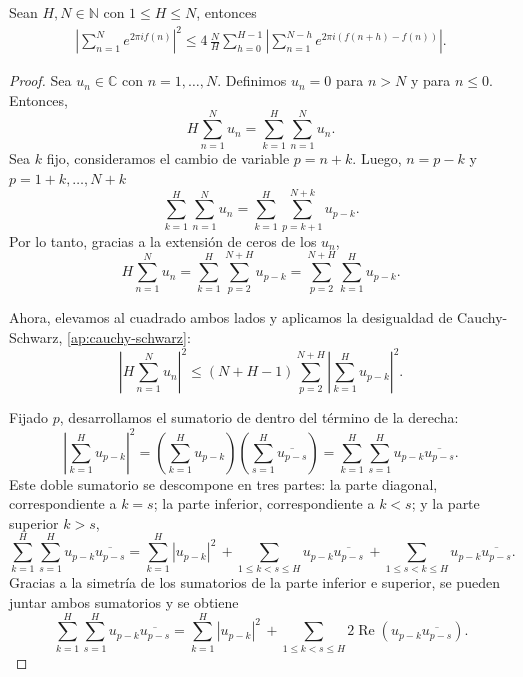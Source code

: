 \begin{lemma}
    \label{lem:vandercorput}
    Sean $H,N \in \mathbb{N}$ con $1 \leq H \leq N$, entonces
    \begin{align}
        \left| \sum_{n=1}^N e^{2\pi i f(n)} \right|^2 \leq
        4 \, \frac{N}{H} \sum_{h=0}^{H-1} \left| \sum_{n=1}^{N-h} e^{2\pi i (f(n+h) - f(n))} \right|.
    \end{align}
\end{lemma}

\begin{proof}
    Sea $u_n \in \mathbb{C}$ con $n = 1, \dots, N$. Definimos $u_n = 0$ para $n > N$ y 
    para $n \leq 0$. Entonces,
    \[
        H \sum_{n=1}^{N} u_n = \sum_{k=1}^{H} \sum_{n=1}^{N} u_n.
    \]
    Sea $k$ fijo, consideramos el cambio de variable $p = n+k$. Luego, $n = p-k$ y $p=1+k,\dots,N+k$
    \[
        \sum_{k=1}^{H} \sum_{n=1}^{N} u_n =
        \sum_{k=1}^{H} \sum_{p=k+1}^{N+k} u_{p-k}.
    \]
    Por lo tanto, gracias a la extensión de ceros de los $u_n$,
    \[
        H \sum_{n=1}^{N} u_n =
        \sum_{k=1}^{H} \sum_{p=2}^{N+H} u_{p-k} =
        \sum_{p=2}^{N+H} \sum_{k=1}^{H} u_{p-k}.
    \]
    
    Ahora, elevamos al cuadrado ambos lados y aplicamos la desigualdad de Cauchy-Schwarz, \ref{ap:cauchy-schwarz}:
    \[
        \left| H \sum_{n=1}^{N} u_n \right|^2 \leq
        (N+H-1) \sum_{p=2}^{N+H} \left| \sum_{k=1}^{H} u_{p-k} \right|^2.
    \]
    
    Fijado $p$, desarrollamos el sumatorio de dentro del término de la derecha:
    \[
        \left|  \sum_{k=1}^{H} u_{p-k} \right|^2 =
        \left(\sum_{k=1}^{H} u_{p-k} \right)\left( \sum_{s=1}^{H} \overline{u_{p-s}} \right) =
        \sum_{k=1}^{H} \sum_{s=1}^{H} u_{p-k} \overline{u_{p-s}}.
    \]
    Este doble sumatorio se descompone en tres partes: la parte diagonal, correspondiente a $k=s$;
    la parte inferior, correspondiente a $k < s$; y la parte superior $k > s$,
    \[
        \sum_{k=1}^{H} \sum_{s=1}^{H} u_{p-k} \overline{u_{p-s}} =
        \sum_{k=1}^{H} |u_{p-k}|^2 \, +
        \sum_{1 \leq k < s \leq H} u_{p-k} \overline{u_{p-s}} \, +
        \sum_{1 \leq s < k \leq H} u_{p-k} \overline{u_{p-s}}.
    \]
    Gracias a la simetría de los sumatorios de la parte inferior e superior,
    se pueden juntar ambos sumatorios y se obtiene
    \[
        \sum_{k=1}^{H} \sum_{s=1}^{H} u_{p-k} \overline{u_{p-s}} =
        \sum_{k=1}^{H} |u_{p-k}|^2 \, +
        \sum_{1 \leq k < s \leq H} 2\operatorname{Re}(u_{p-k} \overline{u_{p-s}}).
    \]


\end{proof}
